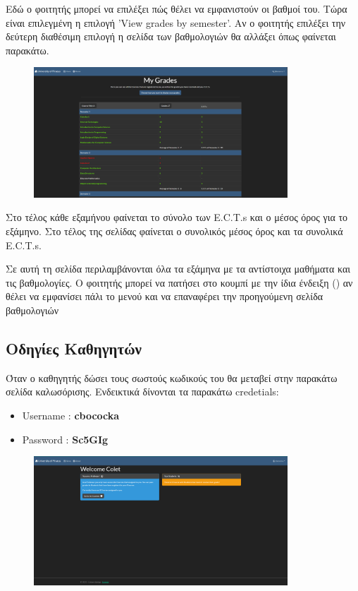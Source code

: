 \documentclass[12pt]{article}
\begin{document}
	Εδώ ο φοιτητής μπορεί να επιλέξει πώς θέλει να εμφανιστούν οι βαθμοί του. Τώρα είναι επιλεγμένη η επιλογή 'View grades by semester'. Αν ο φοιτητής επιλέξει την δεύτερη διαθέσιμη επιλογή η σελίδα των βαθμολογιών θα αλλάξει όπως φαίνεται παρακάτω.
	
	\begin{figure}[H]
	\centering
	\includegraphics[width=0.85\textwidth]{allgrades.png}
	\caption{}
	\label{fig:emptyView}
	\end{figure}

	Στο τέλος κάθε εξαμήνου φαίνεται το σύνολο των E.C.T.s και ο μέσος όρος για το εξάμηνο. Στο τέλος της σελίδας φαίνεται ο συνολικός μέσος όρος και τα συνολικά E.C.T.s.
	
	Σε αυτή τη σελίδα περιλαμβάνονται όλα τα εξάμηνα με τα αντίστοιχα μαθήματα και τις βαθμολογίες. Ο φοιτητής μπορεί να πατήσει στο κουμπί με την ίδια ένδειξη () αν θέλει να εμφανίσει πάλι το μενού και να επαναφέρει την προηγούμενη σελίδα βαθμολογιών
		

	\newpage
	\subsection{Οδηγίες Καθηγητών}
	
	Όταν ο καθηγητής δώσει τους σωστούς κωδικούς του θα μεταβεί στην παρακάτω σελίδα καλωσόρισης. Ενδεικτικά δίνονται τα παρακάτω credetials:
	
	\begin{itemize}
		\item Username : \textbf{cbococka}
		\item Password : \textbf{Sc5GIg}
	\end{itemize}

	\begin{figure}[H]
	\centering
	\includegraphics[width=0.85\textwidth]{wellprof.png}
	\caption{}
	\label{fig:emptyView}
	\end{figure}
\end{document}
